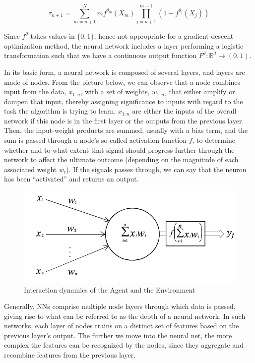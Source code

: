 \documentclass{article}
\begin{document}
\begin{equation}
\tau_{n+1} = \sum_{m=n+1}^N m f^{\theta_m}(X_m) \prod _{j=n+1}^{m-1} (1-f^{\theta_j}(X_j))
\end{equation}

Since $f^{\theta}$ takes values in $\{ 0,1 \}$, hence not appropriate for a gradient-descent optimization method, the neural network includes a layer performing a logistic transformation such that we have a continuous output function $F^{\theta}: \mathbb{R}^d \rightarrow (0,1)$.

In its basic form, a neural network is composed of several layers, and layers are made of nodes. From the picture below, we can observe that a node combines input from the data, $x_{1:n}$, with a set of weights, $w_{1:n}$, that either amplify or dampen that input, thereby assigning significance to inputs with regard to the task the algorithm is trying to learn. $x_{1:n}$ are either the inputs of the overall network if this node is in the first layer or the outputs from the previous layer. Then, the input-weight products are summed, usually with a bias term, and the sum is passed through a node’s so-called activation function $f$, to determine whether and to what extent that signal should progress further through the network to affect the ultimate outcome (depending on the magnitude of each associated weight $w_i$). If the signals passes through, we can say that the neuron has been “activated” and returns an output.

\begin{figure}[H] 
	\centering
	\includegraphics[scale=0.4]{one_node_NN.png}
	\caption{Interaction dynamics of the Agent and the Environment}
	\label{fig:diagram}
\end{figure}


Generally, NNs comprise multiple node layers through which data is passed, giving rise to what can be referred to as the depth of a neural network. In such networks, each layer of nodes trains on a distinct set of features based on the previous layer’s output. The further we move into the neural net, the more complex the features can be recognized by the nodes, since they aggregate and recombine features from the previous layer.
\end{document}

